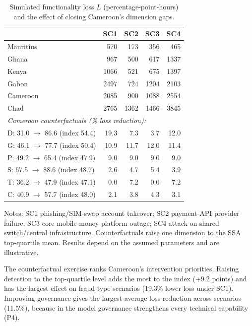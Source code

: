 \documentclass[fintech,article,submit,pdftex,moreauthors]{Definitions/mdpi}
\begin{document}
\begin{table}[H]
\centering
\caption{Simulated functionality loss $L$ (percentage-point-hours) and the effect of closing Cameroon's dimension gaps.}
\label{tab:scen}
\small
\begin{threeparttable}
\begin{tabular}{l rrrr}
\toprule
 & SC1 & SC2 & SC3 & SC4 \\
\midrule
Mauritius & 570 & 173 & 356 & 465 \\
Ghana & 967 & 500 & 617 & 1337 \\
Kenya & 1066 & 521 & 675 & 1397 \\
Gabon & 2497 & 724 & 1204 & 2103 \\
Cameroon & 2085 & 900 & 1088 & 2554 \\
Chad & 2765 & 1362 & 1466 & 3845 \\
\midrule
\multicolumn{5}{l}{\textit{Cameroon counterfactuals (\% loss reduction):}} \\
\quad D: 31.0 $\rightarrow$ 86.6 (index 54.4) & 19.3 & 7.3 & 3.7 & 12.0 \\
\quad G: 46.1 $\rightarrow$ 77.7 (index 50.4) & 10.9 & 11.7 & 12.0 & 11.4 \\
\quad P: 49.2 $\rightarrow$ 65.4 (index 47.9) & 9.0 & 9.0 & 9.0 & 9.0 \\
\quad S: 67.5 $\rightarrow$ 88.6 (index 48.7) & 2.6 & 4.7 & 5.4 & 3.9 \\
\quad T: 36.2 $\rightarrow$ 47.9 (index 47.1) & 0.0 & 7.2 & 0.0 & 7.2 \\
\quad C: 40.9 $\rightarrow$ 57.7 (index 48.0) & 2.1 & 3.8 & 4.3 & 3.1 \\
\bottomrule
\end{tabular}
\begin{tablenotes}\footnotesize
\item Notes: SC1 phishing/SIM-swap account takeover; SC2 payment-API provider failure; SC3 core mobile-money platform outage; SC4 attack on shared switch/central infrastructure. Counterfactuals raise one dimension to the SSA top-quartile mean. Results depend on the assumed parameters and are illustrative.
\end{tablenotes}
\end{threeparttable}
\end{table}

The counterfactual exercise ranks Cameroon's intervention priorities. Raising detection to the top-quartile level adds the most to the index (+9.2 points) and has the largest effect on fraud-type scenarios (19.3\% lower loss under SC1). Improving governance gives the largest average loss reduction across scenarios (11.5\%), because in the model governance strengthens every technical capability (P4).
\end{document}
